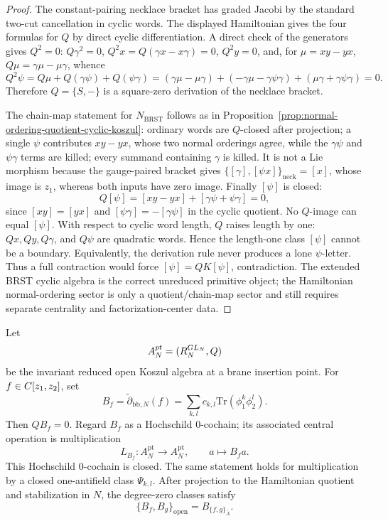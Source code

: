 \documentclass[11pt]{memoir}
\begin{document}
\begin{proof}
  The constant-pairing necklace bracket has graded Jacobi by the standard
  two-cut cancellation in cyclic words.  The displayed Hamiltonian gives
  the four formulas for \(Q\) by direct cyclic differentiation.  A direct
  check of the generators gives \(Q^2=0\): \(Q\gamma^2=0\),
  \(Q^2x=Q(\gamma x-x\gamma)=0\), \(Q^2y=0\), and, for
  \(\mu=xy-yx\), \(Q\mu=\gamma\mu-\mu\gamma\), whence
  \[
    Q^2\psi
      =Q\mu+Q(\gamma\psi)+Q(\psi\gamma)
      =(\gamma\mu-\mu\gamma)+(-\gamma\mu-\gamma\psi\gamma)
        +(\mu\gamma+\gamma\psi\gamma)=0 .
  \]
  Therefore \(Q=\{S,-\}\) is a square-zero derivation of the necklace
  bracket.

  The chain-map statement for \(N_{\mathrm{BRST}}\) follows as in
  Proposition~\ref{prop:normal-ordering-quotient-cyclic-koszul}: ordinary
  words are \(Q\)-closed after projection; a single \(\psi\) contributes
  \(xy-yx\), whose two normal orderings agree, while the \(\gamma\psi\) and
  \(\psi\gamma\) terms are killed; every summand containing \(\gamma\) is
  killed.  It is not a Lie morphism because the gauge-paired bracket gives
  \(\{[\gamma],[\psi x]\}_{\mathrm{neck}}=[x]\), whose image is \(z_1\),
  whereas both inputs have zero image.  Finally \([\psi]\) is closed:
  \[
    Q[\psi]=[xy-yx]+[\gamma\psi+\psi\gamma]=0,
  \]
  since \([xy]=[yx]\) and \([\psi\gamma]=-[\gamma\psi]\) in the cyclic
  quotient.  No \(Q\)-image can equal \([\psi]\).  With respect to cyclic
  word length, \(Q\) raises length by one: \(Qx,Qy,Q\gamma\), and
  \(Q\psi\) are quadratic words.  Hence the length-one class \([\psi]\)
  cannot be a boundary.  Equivalently, the derivation rule never produces
  a lone \(\psi\)-letter.  Thus a full contraction would force
  \([\psi]=QK[\psi]\), contradiction.  The extended BRST cyclic algebra is
  the correct unreduced primitive object; the Hamiltonian normal-ordering
  sector is only a quotient/chain-map sector and still requires separate
  centrality and factorization-center data.
\end{proof}

\begin{prop}\label{prop:stalk-central-multiplication}
  Let
  $$A_N^{pt}=(R_N^{GL_N},Q)$$
  be the invariant reduced open Koszul algebra at a brane insertion point. For
  $f\in C[z_1,z_2]$, set
  $$B_f=\widetilde\partial_{\mathrm{bb},N}(f)
    =\sum_{k,l}c_{k,l}\mathrm{Tr}(\phi_1^k\phi_2^l).$$
  Then $QB_f=0$. Regard $B_f$ as a Hochschild $0$-cochain; its associated
  central operation is multiplication
  $$L_{B_f}:A_N^{\mathrm{pt}}\to A_N^{\mathrm{pt}},\qquad
    a\longmapsto B_fa.$$
  This Hochschild $0$-cochain is closed. The same statement holds for
  multiplication by a closed one-antifield class $\Psi_{k,l}$. After projection to the
  Hamiltonian quotient and stabilization in $N$, the degree-zero classes satisfy
  $$\{B_f,B_g\}_{\mathrm{open}}=B_{\{f,g\}_{\bar A}}.$$
\end{prop}
\end{document}
